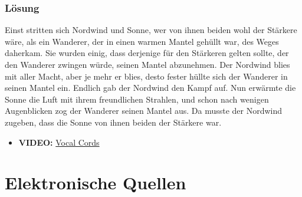 \begin{frame}
\frametitle{Lösung}

Einst stritten sich Nordwind und Sonne, wer von ihnen beiden wohl der Stärkere wäre, als ein
Wanderer, der in einen warmen Mantel gehüllt war, des Weges daherkam. Sie wurden einig, dass
derjenige für den Stärkeren gelten sollte, der den Wanderer zwingen würde, seinen Mantel
abzunehmen. Der Nordwind blies mit aller Macht, aber je mehr er blies, desto fester hüllte sich der
Wanderer in seinen Mantel ein. Endlich gab der Nordwind den Kampf auf. Nun erwärmte die Sonne die
Luft mit ihrem freundlichen Strahlen, und schon nach wenigen Augenblicken zog der Wanderer seinen
Mantel aus. Da musste der Nordwind zugeben, dass die Sonne von ihnen beiden der Stärkere war.

\end{frame}


\begin{frame}{\textipa{[ S l U s ]}}

	\begin{itemize}
		\item \textbf{VIDEO:} \href{run:material/04vocalcordssinging.wmv}{Vocal Cords}
	\end{itemize}
	
\end{frame}


%
\section{Elektronische Quellen}

